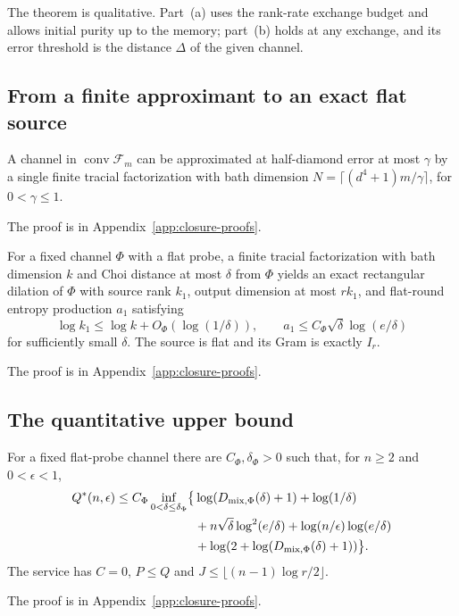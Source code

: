 The theorem is qualitative. Part~(a) uses the rank-rate exchange budget and allows initial purity up to the memory; part~(b) holds at
any exchange, and its error threshold is the distance $\Delta$ of the given channel.

\subsection{From a finite approximant to an exact flat source}

\begin{lemma}\label{lem:mixture-flat}
A channel in $\operatorname{conv}\mathcal F_m$ can be approximated at half-diamond error at most $\gamma$ by a single finite
tracial factorization with bath dimension $N=\lceil(d^4+1)m/\gamma\rceil$, for $0<\gamma\le1$.
\end{lemma}
The proof is in Appendix~\ref{app:closure-proofs}.

\begin{lemma}\label{lem:generic-repair}
For a fixed channel $\Phi$ with a flat probe, a finite tracial factorization with bath dimension $k$ and Choi distance at most $\delta$ from
$\Phi$ yields an exact rectangular dilation of $\Phi$ with source rank $k_1$, output dimension at most $rk_1$, and flat-round entropy
production $a_1$ satisfying
\[
 \log k_1\le\log k+O_\Phi(\log(1/\delta)),\qquad
 a_1\le C_\Phi\sqrt\delta\log(e/\delta)
\]
for sufficiently small $\delta$. The source is flat and its Gram is exactly $I_r$.
\end{lemma}
The proof is in Appendix~\ref{app:closure-proofs}.

\subsection{The quantitative upper bound}

\begin{theorem}\label{thm:generic-upper}
For a fixed flat-probe channel there are $C_\Phi,\delta_\Phi>0$ such that, for $n\ge2$ and $0<\epsilon<1$,
\begin{align*}
 Q^{*}(n,\epsilon)\le C_\Phi\inf_{0<\delta\le\delta_\Phi}\bigl\{&
 \log(D_{\rm mix,\Phi}(\delta)+1)+\log(1/\delta)\\
 &+n\sqrt\delta\log^2(e/\delta)+\log(n/\epsilon)\log(e/\delta)\\
 &+\log(2+\log(D_{\rm mix,\Phi}(\delta)+1))\bigr\}.
\end{align*}
The service has $C=0$, $P\le Q$ and $J\le\lfloor(n-1)\log r/2\rfloor$.
\end{theorem}
The proof is in Appendix~\ref{app:closure-proofs}.

